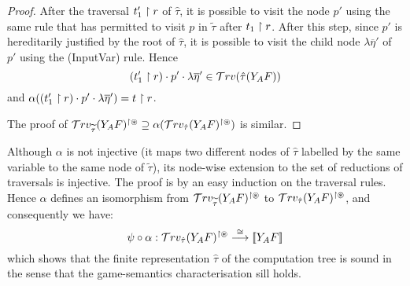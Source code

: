 \documentclass{article}
\begin{document}
\begin{proof}
After the traversal $t_1'\upharpoonright r$ of $\hat\tau$, it is possible to
visit the node $p'$ using the same rule that has permitted to visit
$p$ in $\widetilde\tau$ after $t_1\upharpoonright r$. After this step, since $p'$ is
hereditarily justified by the root of $\hat\tau$, it is possible to
visit the child node $\lambda \overline{\eta}'$ of $p'$ using the
(InputVar) rule. Hence
$$(t_1'\upharpoonright r) \cdot p' \cdot \lambda \overline{\eta}' \in \mathcal{T}rv(\hat\tau(Y_A F)) $$
and $\alpha((t_1'\upharpoonright r) \cdot p' \cdot \lambda \overline{\eta}')
= t\upharpoonright r$.

The proof of $\mathcal{T}rv_{\widetilde\tau}(Y_A F)^{\upharpoonright \circledast} \supseteq
\alpha(\mathcal{T}rv_{\hat\tau}(Y_A F)^{\upharpoonright \circledast})$ is similar.
\end{proof}

Although $\alpha$ is not injective (it maps two different nodes of $\hat\tau$ labelled by the same variable to the same node of $\widetilde\tau$), its node-wise extension to the set of reductions of traversals is injective.
The proof is by an easy induction on the traversal rules. Hence $\alpha$ defines an isomorphism from $\mathcal{T}rv_{\widetilde\tau}(Y_A
F)^{\upharpoonright \circledast}$ to $\mathcal{T}rv_{\hat\tau}(Y_A F)^{\upharpoonright
\circledast}$, and  consequently we have:
$$ \psi  \circ \alpha : \mathcal{T}rv_{\hat\tau}( Y_A F)^{\upharpoonright \circledast} \stackrel{\cong}{\longrightarrow} {[\![ Y_A F ]\!]}$$
which shows that the finite representation $\hat\tau$ of the computation tree is sound in the sense that the game-semantics characterisation sill holds.
\end{document}
